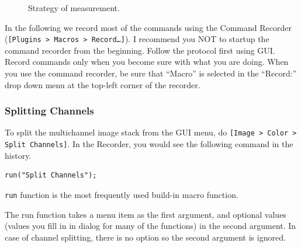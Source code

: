 \documentclass[11pt,a4paper,oneside]{report}
\newcommand{\ijmenu}[1]{\texttt{\small#1}}
\newcommand{\ilcom}[1]{\texttt{\small#1}}
\begin{document}
\begin{figure}[h!]
 \quad
 \caption{Strategy of measurement.}
 \label{fig:nucsegProc}
\end{figure}


In the following we record most of the commands using the Command Recorder (\ijmenu{[Plugins > Macros > Record\ldots]}). I recommend you NOT to startup the command recorder from the beginning. Follow the protocol first using GUI. Record commands only when you become sure with what you are doing. When you use the command recorder, be sure that ``Macro'' is selected in the ``Record:'' drop down menu at the top-left corner of the recorder.

\subsubsection{Splitting Channels}

To split the multichannel image stack from the GUI menu, do \ilcom{[Image > Color > Split Channels]}. In the Recorder, you would see the following command in the history. 
\begin{lstlisting}[numbers=none]
run("Split Channels");
\end{lstlisting}

\ilcom{run} function is the most frequently used build-in macro function. 


The run function takes a menu item as the first argument, and optional values (values you fill in in dialog for many of the functions) in the second argument. In case of channel splitting, there is no option so the second argument is ignored. 
\end{document}
